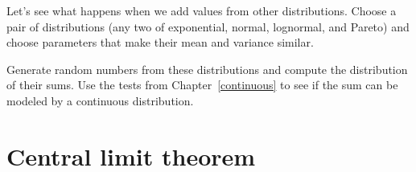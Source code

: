 \documentclass[12pt]{book}
\begin{document}
\begin{exercise}
Let's see what happens when we add values from
other distributions.  Choose a pair of distributions (any two of
exponential, normal, lognormal, and Pareto) and choose parameters
that make their mean and variance similar.

Generate random numbers from these distributions and compute the
distribution of their sums.  Use the tests from
Chapter~\ref{continuous} to see if the sum can be modeled by a
continuous distribution.

\end{exercise}



%
%
%
%

%
%






\section{Central limit theorem}
\label{CLT}
\end{document}
